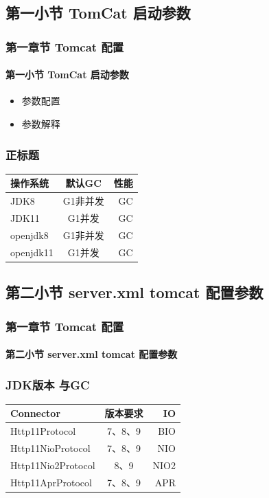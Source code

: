 \documentclass{beamer}
\begin{document}
\subsection{第一小节 TomCat 启动参数 }

\begin{frame}
    \frametitle{第一章节 Tomcat 配置}
    \framesubtitle{第一小节 TomCat 启动参数}
     \begin{itemize}
    	\item 参数配置
    	\item 参数解释
    \end{itemize}
\end{frame}

\begin{frame}
\frametitle{正标题}
   \centering
\begin{tabular}{|l|c|r|}
	\hline 
  \Huge	操作系统&  \Huge 默认GC&  \Huge 性能 \\
	\hline 
	JDK8 & G1非并发 &  GC \\
	\hline 
	JDK11 & G1并发 & GC \\
	\hline 
	openjdk8 & G1非并发& GC  \\
	\hline 
	openjdk11& G1并发 & GC \\
	\hline
\end{tabular}
\end{frame}


\subsection{第二小节 server.xml tomcat 配置参数}

\begin{frame}
    \frametitle{第一章节 Tomcat 配置}
    \framesubtitle{第二小节 server.xml tomcat 配置参数}
    
\end{frame}

\begin{frame}
\frametitle{JDK版本 与GC}
\centering
\begin{tabular}{|l|c|r|}
	\hline 
	\Huge	Connector&  \Huge 版本要求&  \Huge IO \\
	\hline 
	Http11Protocol & 7、8、9 & BIO \\
	\hline 
	Http11NioProtocol & 7、8、9 & NIO \\
	\hline 
	Http11Nio2Protocol & 8、9& NIO2  \\
	\hline 
	Http11AprProtocol& 7、8、9 & APR \\
	\hline
\end{tabular}
\end{frame}
\end{document}
